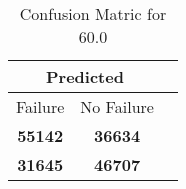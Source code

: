 \begin{table}[] 
\caption{Confusion Matric for 60.0} 
\label{Table: Prediction Accuracy-DMD60.0OnlySunEKF-ignoreReflection-Reflection} 
\centering 
\begin{tabular} 
 {@{}ccc@{}} 
\toprule 
\multicolumn{2}{c}{\textbf{Predicted}}
 \\ \midrule 
\multicolumn{1}{|c|}{Failure} & 
\multicolumn{1}{c|}{No Failure}
 \\ \midrule 
\multicolumn{1}{|c|}{\color{green}\textbf{55142}} & 
\multicolumn{1}{c|}{\color{red}\textbf{36634}}
 \\ \midrule 
\multicolumn{1}{|c|}{\color{red}\textbf{31645}} & 
\multicolumn{1}{c|}{\color{green}\textbf{46707}}
 \\ \bottomrule 
\end{tabular} 
\end{table} 
